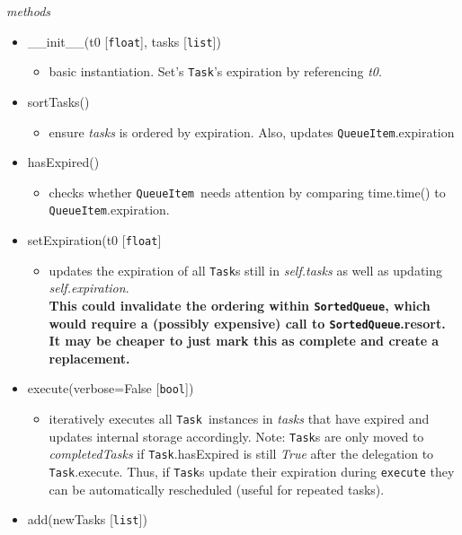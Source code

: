 \documentclass{article}
\newcommand{\SortedQueue}{\texttt{SortedQueue}}
\newcommand{\QueueItem}{\texttt{QueueItem}}
\newcommand{\Task}{\texttt{Task}}
\newcommand{\pythonfloat}{\texttt{float}}
\newcommand{\pythonbool}{\texttt{bool}}
\newcommand{\pythonlist}{\texttt{list}}
\begin{document}
\noindent
\textit{methods}

\begin{itemize}
    \item{\_\_init\_\_(t0 [\pythonfloat], tasks [\pythonlist])
        \begin{itemize}
            \item{basic instantiation. Set's \Task's expiration by referencing \textit{t0}.}
        \end{itemize}
         }
    \item{sortTasks()
        \begin{itemize}
            \item{ensure \textit{tasks} is ordered by expiration. Also, updates \QueueItem.expiration}
        \end{itemize}
         }
    \item{hasExpired()
        \begin{itemize}
            \item{checks whether \QueueItem~needs attention by comparing time.time() to \QueueItem.expiration.}
        \end{itemize}
         }
    \item{setExpiration(t0 [\pythonfloat]
        \begin{itemize}
            \item{updates the expiration of all {\Task}s still in \textit{self.tasks} as well as updating \textit{self.expiration}. \\ \textbf{This could invalidate the ordering within \SortedQueue, which would require a (possibly expensive) call to \SortedQueue.resort. It may be cheaper to just mark this as complete and create a replacement.}}
        \end{itemize}
         }
    \item{execute(verbose=False [\pythonbool])
        \begin{itemize}
            \item{iteratively executes all \Task~instances in \textit{tasks} that have expired and updates internal storage accordingly. Note: {\Task}s are only moved to \textit{completedTasks} if \Task.hasExpired is still \textit{True} after the delegation to \Task.execute. Thus, if {\Task}s update their expiration during \texttt{execute} they can be automatically rescheduled (useful for repeated tasks).}
        \end{itemize}
         }
    \item{add(newTasks [\pythonlist])
        \begin{itemize}

\end{itemize}}
\end{itemize}
\end{document}
